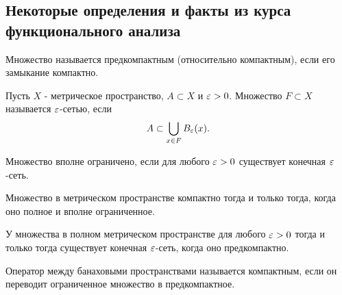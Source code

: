 
\subsection*{Некоторые определения и факты из курса функционального анализа}

\begin{definition}
Множество называется предкомпактным (относительно компактным), если его замыкание компактно.
\end{definition}

\begin{definition} Пусть $X$ - метрическое пространство, $A \subset X$ и $\varepsilon > 0$. Множество  $F \subset X$ называется $\varepsilon$-сетью, если
$$ A \subset \bigcup_{x \in F} B_\varepsilon (x).$$
\end{definition}

\begin{definition}
Множество вполне ограничено, если для любого $\varepsilon > 0$ существует конечная $\varepsilon$-сеть.
\end{definition}

\begin{theorem}[Хаусдорф]
Множество в метрическом пространстве компактно тогда и только тогда, когда оно полное и вполне ограниченное. 
\end{theorem}

\begin{corollary}
У множества в полном метрическом пространстве для любого $\varepsilon > 0$ тогда и только тогда существует конечная $\varepsilon$-сеть, когда оно предкомпактно.
\end{corollary}

\begin{definition}
Оператор между банаховыми пространствами называется компактным, если он переводит ограниченное множество в предкомпактное.
\end{definition}

